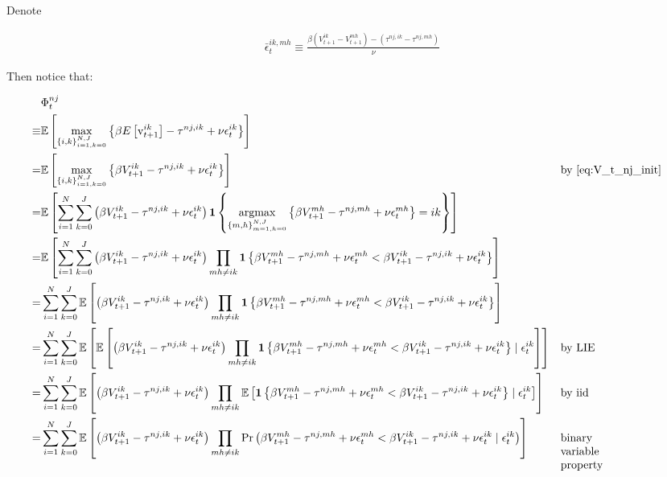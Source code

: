 \documentclass[10pt]{article}
\begin{document}
Denote

\begin{align}
    \bar{\epsilon}_t^{i k, m h} \equiv \frac{\beta\left(V_{t+1}^{i k}-V_{t+1}^{m h}\right)-\left(\tau^{n j, i k}-\tau^{n j, m h}\right)}{\nu} \label{eq:bar_epsilon_exp}
\end{align}

Then notice that:

\begin{align}
    &\Phi_t^{n j} \\
    \equiv &\mathbb{E}\left[\max _{\{i, k\}_{i=1, k=0}^{N, J}}\left\{\beta E\left[\mathrm{v}_{t+1}^{i k}\right]-\tau^{n j, i k}+\nu \epsilon_t^{i k}\right\}\right] \\
    = &\mathbb{E}\left[\max _{\{i, k\}_{i=1, k=0}^{N, J}} \left\{ \beta V_{t+1}^{i k}-\tau^{n j, i k}+\nu \epsilon_t^{i k} \right\}\right] && \text{by \eqref{eq:V_t_nj_init}} \\
    = &\mathbb{E}\left[ \sum_{i = 1}^N \sum_{k = 0}^J \left(\beta V_{t+1}^{i k}-\tau^{n j, i k}+\nu \epsilon_t^{i k}\right) \mathbf{1}\left\{ \underset{{\{m, h\}_{m=1, h=0}^{N, J}}}{\text{argmax}} \left\{ \beta V_{t+1}^{m h}-\tau^{n j, m h}+\nu \epsilon_t^{m h} \right\} = i k \right\} \right] \\
    = &\mathbb{E}\left[ \sum_{i = 1}^N \sum_{k = 0}^J \left(\beta V_{t+1}^{i k}-\tau^{n j, i k}+\nu \epsilon_t^{i k}\right) \prod_{m h \neq i k} \mathbf{1}\left\{ \beta V_{t+1}^{m h}-\tau^{n j, m h}+\nu \epsilon_t^{m h} < \beta V_{t+1}^{i k}-\tau^{n j, i k}+\nu \epsilon_t^{i k} \right\} \right] \\
    = &\sum_{i=1}^N \sum_{k=0}^J \mathbb{E}\left[ \left(\beta V_{t+1}^{i k}-\tau^{n j, i k}+\nu \epsilon_t^{i k}\right) \prod_{m h \neq i k} \mathbf{1}\left\{ \beta V_{t+1}^{m h}-\tau^{n j, m h}+\nu \epsilon_t^{m h} < \beta V_{t+1}^{i k}-\tau^{n j, i k}+\nu \epsilon_t^{i k} \right\} \right] \\
    = &\sum_{i=1}^N \sum_{k=0}^J \mathbb{E}\left[ \mathbb{E} \left[ \left(\beta V_{t+1}^{i k}-\tau^{n j, i k}+\nu \epsilon_t^{i k}\right) \prod_{m h \neq i k} \mathbf{1}\left\{ \beta V_{t+1}^{m h}-\tau^{n j, m h}+\nu \epsilon_t^{m h} < \beta V_{t+1}^{i k}-\tau^{n j, i k}+\nu \epsilon_t^{i k} \right\} \mid \epsilon_t^{i k} \right] \right] && \text{by LIE} \\
    = &\sum_{i=1}^N \sum_{k=0}^J \mathbb{E}\left[ \left(\beta V_{t+1}^{i k}-\tau^{n j, i k}+\nu \epsilon_t^{i k}\right) \prod_{m h \neq i k} \mathbb{E} \left[ \mathbf{1}\left\{ \beta V_{t+1}^{m h}-\tau^{n j, m h}+\nu \epsilon_t^{m h} < \beta V_{t+1}^{i k}-\tau^{n j, i k}+\nu \epsilon_t^{i k} \right\} \mid \epsilon_t^{i k} \right] \right]  && \text{by iid}\\
    = &\sum_{i=1}^N \sum_{k=0}^J \mathbb{E}\left[ \left(\beta V_{t+1}^{i k}-\tau^{n j, i k}+\nu \epsilon_t^{i k}\right) \prod_{m h \neq i k} \Pr \left(\beta V_{t+1}^{m h}-\tau^{n j, m h}+\nu \epsilon_t^{m h} < \beta V_{t+1}^{i k}-\tau^{n j, i k}+\nu \epsilon_t^{i k} \mid \epsilon_t^{i k} \right) \right] && \parbox[t]{1.5cm}{\raggedright binary variable property}
\end{align}
\end{document}
